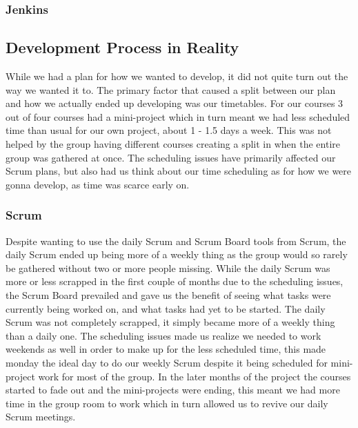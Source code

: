 \subsubsection{Jenkins}
\subsection{Development Process in Reality}
While we had a plan for how we wanted to develop, it did not quite turn out the way we wanted it to.
The primary factor that caused a split between our plan and how we actually ended up developing was our timetables.
For our courses 3 out of four courses had a mini-project which in turn meant we had less scheduled time than usual for our own project, about 1 - 1.5 days a week.
This was not helped by the group having different courses creating a split in when the entire group was gathered at once.
The scheduling issues have primarily affected our Scrum plans, but also had us think about our time scheduling as for how we were gonna develop, as time was scarce early on.
\subsubsection{Scrum}
Despite wanting to use the daily Scrum and Scrum Board tools from Scrum, the daily Scrum ended up being more of a weekly thing as the group would so rarely be gathered without two or more people missing.
While the daily Scrum was more or less scrapped in the first couple of months due to the scheduling issues, the Scrum Board prevailed and gave us the benefit of seeing what tasks were currently being worked on, and what tasks had yet to be started.
The daily Scrum was not completely scrapped, it simply became more of a weekly thing than a daily one.
The scheduling issues made us realize we needed to work weekends as well in order to make up for the less scheduled time, this made monday the ideal day to do our weekly Scrum despite it being scheduled for mini-project work for most of the group.
In the later months of the project the courses started to fade out and the mini-projects were ending, this meant we had more time in the group room to work which in turn allowed us to revive our daily Scrum meetings.
